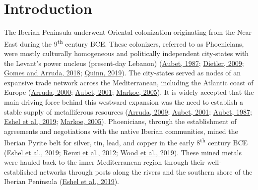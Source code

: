 \documentclass[3p]{elsarticle} %
\begin{document}
\hypertarget{introduction}{%
\section{Introduction}\label{introduction}}

The Iberian Peninsula underwent Oriental colonization originating from the Near East during the 9\textsuperscript{th} century BCE. These colonizers, referred to as Phoenicians, were mostly culturally homogeneous and politically independent city-states with the Levant's power nucleus (present-day Lebanon) (\protect\hyperlink{ref-aubet87}{Aubet, 1987}; \protect\hyperlink{ref-dietler09}{Dietler, 2009}; \protect\hyperlink{ref-gomes_arruda18}{Gomes and Arruda, 2018}; \protect\hyperlink{ref-quinn19}{Quinn, 2019}). The city-states served as nodes of an expansive trade network across the Mediterranean, including the Atlantic coast of Europe (\protect\hyperlink{ref-arruda00}{Arruda, 2000}; \protect\hyperlink{ref-aubet01}{Aubet, 2001}; \protect\hyperlink{ref-markoe05}{Markoe, 2005}). It is widely accepted that the main driving force behind this westward expansion was the need to establish a stable supply of metalliferous resources (\protect\hyperlink{ref-arruda09}{Arruda, 2009}; \protect\hyperlink{ref-aubet01}{Aubet, 2001}; \protect\hyperlink{ref-aubet87}{Aubet, 1987}; \protect\hyperlink{ref-eshel_etal19}{Eshel et al., 2019}; \protect\hyperlink{ref-markoe05}{Markoe, 2005}). Phoenicians, through the establishment of agreements and negotiations with the native Iberian communities, mined the Iberian Pyrite belt for silver, tin, lead, and copper in the early 8\textsuperscript{th} century BCE (\protect\hyperlink{ref-eshel_etal19}{Eshel et al., 2019}; \protect\hyperlink{ref-renzi_etal12}{Renzi et al., 2012}; \protect\hyperlink{ref-wood_etal19}{Wood et al., 2019}). These mined metals were hauled back to the inner Mediterranean region through their well-established networks through posts along the rivers and the southern shore of the Iberian Peninsula (\protect\hyperlink{ref-eshel_etal19}{Eshel et al., 2019}).
\end{document}
